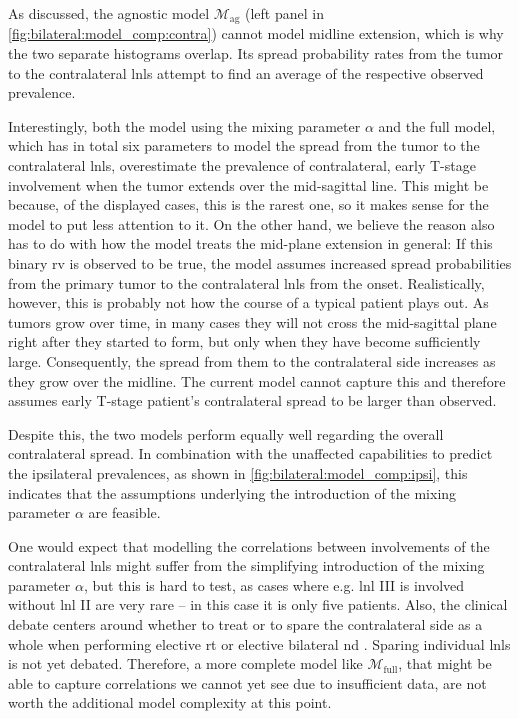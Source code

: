 \documentclass[\relativeRoot/main.tex]{subfiles}
\begin{document}
As discussed, the agnostic model $\mathcal{M}_\text{ag}$ (left panel in \cref{fig:bilateral:model_comp:contra}) cannot model midline extension, which is why the two separate histograms overlap. Its spread probability rates from the tumor to the contralateral \glspl{lnl} attempt to find an average of the respective observed prevalence.

Interestingly, both the model using the mixing parameter $\alpha$ and the full model, which has in total six parameters to model the spread from the tumor to the contralateral \glspl{lnl}, overestimate the prevalence of contralateral, early T-stage involvement when the tumor extends over the mid-sagittal line. This might be because, of the displayed cases, this is the rarest one, so it makes sense for the model to put less attention to it. On the other hand, we believe the reason also has to do with how the model treats the mid-plane extension in general: If this binary \gls{rv} is observed to be true, the model assumes increased spread probabilities from the primary tumor to the contralateral \glspl{lnl} from the onset. Realistically, however, this is probably not how the course of a typical patient plays out. As tumors grow over time, in many cases they will not cross the mid-sagittal plane right after they started to form, but only when they have become sufficiently large. Consequently, the spread from them to the contralateral side increases as they grow over the midline. The current model cannot capture this and therefore assumes early T-stage patient's contralateral spread to be larger than observed.

Despite this, the two models perform equally well regarding the overall contralateral spread. In combination with the unaffected capabilities to predict the ipsilateral prevalences, as shown in \cref{fig:bilateral:model_comp:ipsi}, this indicates that the assumptions underlying the introduction of the mixing parameter $\alpha$ are feasible.

One would expect that modelling the correlations between involvements of the contralateral \glspl{lnl} might suffer from the simplifying introduction of the mixing parameter $\alpha$, but this is hard to test, as cases where e.g. \gls{lnl} III is involved without \gls{lnl} II are very rare -- in this case it is only five patients. Also, the clinical debate centers around whether to treat or to spare the contralateral side as a whole when performing elective \gls{rt} or elective bilateral \gls{nd} \cite{biau_selection_2019,al-mamgani_contralateral_2017}. Sparing individual \glspl{lnl} is not yet debated. Therefore, a more complete model like $\mathcal{M}_\text{full}$, that might be able to capture correlations we cannot yet see due to insufficient data, are not worth the additional model complexity at this point.
\end{document}
